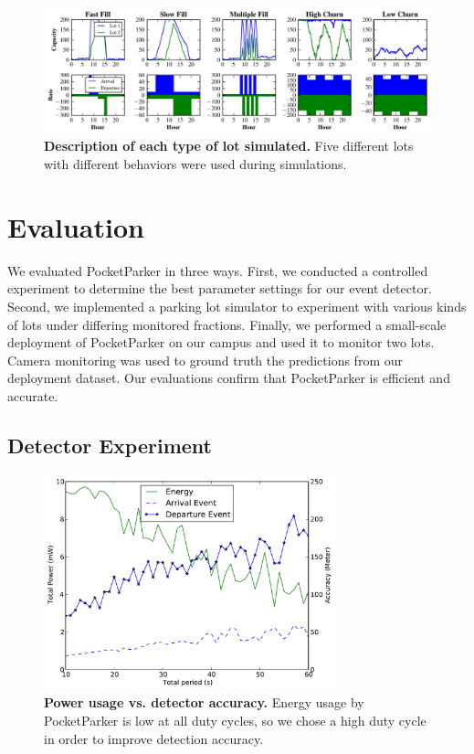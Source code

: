 \begin{figure}[t]
\centering
\includegraphics[width=\textwidth]{./simulator/figures/lots.pdf}

\caption{\textbf{Description of each type of lot simulated.} Five different
lots with different behaviors were used during simulations.}

\label{fig-lotsdescription}
\end{figure}

\section{Evaluation}
\label{sec-evaluation}

We evaluated PocketParker in three ways. First, we conducted a controlled
experiment to determine the best parameter settings for our event detector.
Second, we implemented a parking lot simulator to experiment with various
kinds of lots under differing monitored fractions. Finally, we performed a
small-scale deployment of PocketParker on our campus and used it to monitor
two lots. Camera monitoring was used to ground truth the predictions from
our deployment dataset. Our evaluations confirm that PocketParker is
efficient and accurate.

\subsection{Detector Experiment}

\begin{figure}[t]
\centering
\includegraphics[width=3.325in]{./figures/Energy_accuracy.pdf}

\caption{\textbf{Power usage vs. detector accuracy.} Energy usage by
PocketParker is low at all duty cycles, so we chose a high duty cycle in
order to improve detection accuracy.}

\label{fig-energy}
\end{figure}

